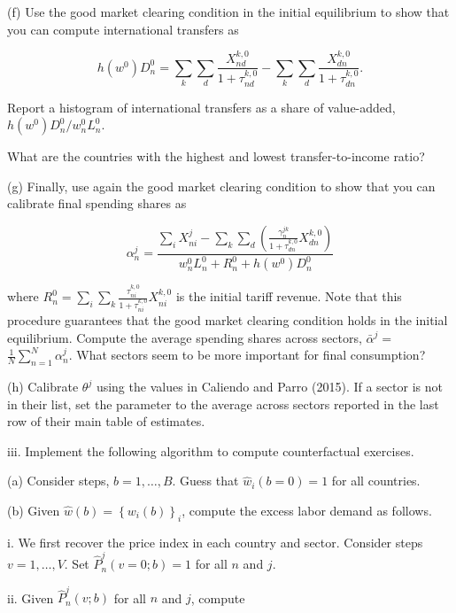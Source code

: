 \documentclass[12pt,oneside,reqno]{article}
\begin{document}
\begin{enumerate}[label=\roman*., leftmargin=*]
(f) Use the good market clearing condition in the initial equilibrium to show that you can compute international transfers as

\begin{equation*}
h\left(w^{0}\right) D_{n}^{0}=\sum_{k} \sum_{d} \frac{X_{n d}^{k, 0}}{1+\tau_{n d}^{k, 0}}-\sum_{k} \sum_{d} \frac{X_{d n}^{k, 0}}{1+\tau_{d n}^{k, 0}} .
\end{equation*}

Report a histogram of international transfers as a share of value-added, $h\left(w^{0}\right) D_{n}^{0} / w_{n}^{0} L_{n}^{0}$.

What are the countries with the highest and lowest transfer-to-income ratio?

(g) Finally, use again the good market clearing condition to show that you can calibrate final spending shares as

\begin{equation*}
\alpha_{n}^{j}=\frac{\sum_{i} X_{n i}^{j}-\sum_{k} \sum_{d}\left(\frac{\gamma_{n}^{j k}}{1+\tau_{d n}^{k, 0}} X_{d n}^{k, 0}\right)}{w_{n}^{0} L_{n}^{0}+R_{n}^{0}+h\left(w^{0}\right) D_{n}^{0}}
\end{equation*}

where $R_{n}^{0}=\sum_{i} \sum_{k} \frac{\tau_{n i}^{k, 0}}{1+\tau_{n i}^{k, 0}} X_{n i}^{k, 0}$ is the initial tariff revenue. Note that this procedure guarantees that the good market clearing condition holds in the initial equilibrium. Compute the average spending shares across sectors, $\bar{\alpha}^{j}=$ $\frac{1}{N} \sum_{n=1}^{N} \alpha_{n}^{j}$. What sectors seem to be more important for final consumption?

(h) Calibrate $\theta^{j}$ using the values in Caliendo and Parro (2015). If a sector is not in their list, set the parameter to the average across sectors reported in the last row of their main table of estimates.

iii. Implement the following algorithm to compute counterfactual exercises.

(a) Consider steps, $b=1, \ldots, B$. Guess that $\hat{w}_{i}(b=0)=1$ for all countries.

(b) Given $\hat{w}(b)=\left\{w_{i}(b)\right\}_{i}$, compute the excess labor demand as follows.

i. We first recover the price index in each country and sector. Consider steps $v=1, \ldots, V$. Set $\hat{P}_{n}^{j}(v=0 ; b)=1$ for all $n$ and $j$.

ii. Given $\hat{P}_{n}^{j}(v ; b)$ for all $n$ and $j$, compute


\end{enumerate}
\end{document}
